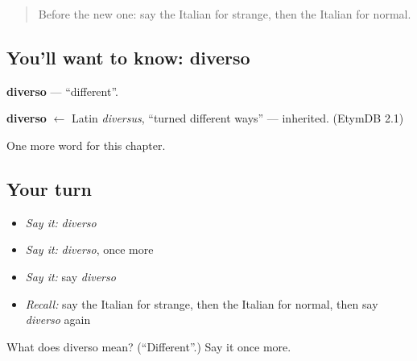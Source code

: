 \begin{quote}
Before the new one: say the Italian for strange, then the Italian for normal.
\end{quote}

\subsection*{You'll want to know: diverso}
\textbf{diverso} — \textquotedblleft{}different\textquotedblright{}.

\begin{cousinweb}
\textbf{diverso} $\leftarrow$ Latin \emph{diversus}, \textquotedblleft{}turned different ways\textquotedblright{} — inherited. (EtymDB 2.1)
\end{cousinweb}

\begin{grammarlens}[title={What you've built}]
One more word for this chapter.
\end{grammarlens}

\subsection*{Your turn}
\begin{itemize}
\raggedright
  \item \emph{Say it:} \emph{diverso}
  \item \emph{Say it:} \emph{diverso}, once more
  \item \emph{Say it:} say \emph{diverso}
  \item \emph{Recall:} say the Italian for strange, then the Italian for normal, then say \emph{diverso} again
\end{itemize}

\begin{tcolorbox}[breakable,colback=teal!4,colframe=teal!35!black,title={Before you move on}]
What does diverso mean? (\textquotedblleft{}Different\textquotedblright{}.) Say it once more.
\end{tcolorbox}
